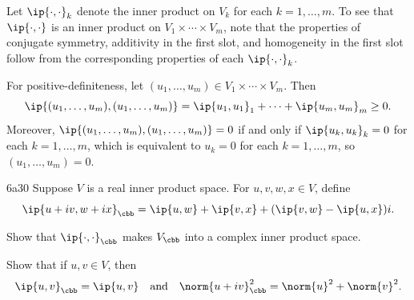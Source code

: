 \begin{sol}
    Let $\ip{\cdot, \cdot}_k$ denote the inner product on $V_k$ for each $k = 1, \ldots, m$.
    To see that $\ip{\cdot, \cdot}$ is an inner product on $V_1 \times \cdots \times V_m$, note that the properties of conjugate symmetry, additivity in the first slot, and homogeneity in the first slot follow from the corresponding properties of each $\ip{\cdot, \cdot}_k$.

    For positive-definiteness, let $(u_1, \ldots, u_m) \in V_1 \times \cdots \times V_m$.
    Then
    \[
        \ip{(u_1, \ldots, u_m), (u_1, \ldots, u_m)} = \ip{u_1, u_1}_1 + \cdots + \ip{u_m, u_m}_m \geq 0.
    \]
    Moreover, $\ip{(u_1, \ldots, u_m), (u_1, \ldots, u_m)} = 0$ if and only if $\ip{u_k, u_k}_k = 0$ for each $k = 1, \ldots, m$, which is equivalent to $u_k = 0$ for each $k = 1, \ldots, m$, so $(u_1, \ldots, u_m) = 0$.
\end{sol}

\begin{exercise}{6a30}
    Suppose $V$ is a real inner product space.
    For $u, v, w, x \in V$, define
    \[
        \ip{u + iv, w + ix}_{\cbb} = \ip{u, w} + \ip{v, x} + (\ip{v, w} - \ip{u, x})i.
    \]
    \begin{subexercises}
        \item Show that $\ip{\cdot, \cdot}_{\cbb}$ makes $V_{\cbb}$ into a complex inner product space.
        \item Show that if $u, v \in V$, then
        \[
            \ip{u, v}_{\cbb} = \ip{u, v} \quad \text{and} \quad \norm{u + iv}_{\cbb}^2 = \norm{u}^2 + \norm{v}^2.
        \]
    \end{subexercises}
\end{exercise}


